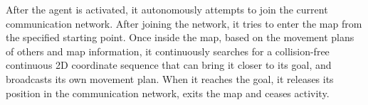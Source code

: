 After the agent is activated, it autonomously attempts to join the current communication network. 
After joining the network, it tries to enter the map from the specified starting point. 
Once inside the map, based on the movement plans of others and map information, it continuously searches for a collision-free continuous 2D coordinate sequence that can bring it closer to its goal, and broadcasts its own movement plan. 
When it reaches the goal, it releases its position in the communication network, exits the map and ceases activity.







